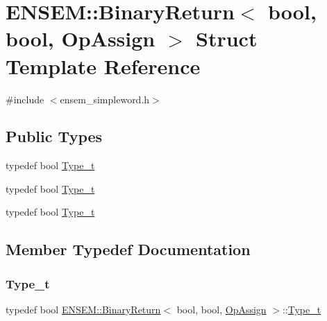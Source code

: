 \hypertarget{structENSEM_1_1BinaryReturn_3_01bool_00_01bool_00_01OpAssign_01_4}{}\section{E\+N\+S\+EM\+:\+:Binary\+Return$<$ bool, bool, Op\+Assign $>$ Struct Template Reference}
\label{structENSEM_1_1BinaryReturn_3_01bool_00_01bool_00_01OpAssign_01_4}


{\ttfamily \#include $<$ensem\+\_\+simpleword.\+h$>$}

\subsection*{Public Types}
\begin{DoxyCompactItemize}
\item 
typedef bool \mbox{\hyperlink{structENSEM_1_1BinaryReturn_3_01bool_00_01bool_00_01OpAssign_01_4_a5520ece3a7087e94fe3d252e1d2ab29f}{Type\+\_\+t}}
\item 
typedef bool \mbox{\hyperlink{structENSEM_1_1BinaryReturn_3_01bool_00_01bool_00_01OpAssign_01_4_a5520ece3a7087e94fe3d252e1d2ab29f}{Type\+\_\+t}}
\item 
typedef bool \mbox{\hyperlink{structENSEM_1_1BinaryReturn_3_01bool_00_01bool_00_01OpAssign_01_4_a5520ece3a7087e94fe3d252e1d2ab29f}{Type\+\_\+t}}
\end{DoxyCompactItemize}


\subsection{Member Typedef Documentation}
\mbox{\label{structENSEM_1_1BinaryReturn_3_01bool_00_01bool_00_01OpAssign_01_4_a5520ece3a7087e94fe3d252e1d2ab29f}} 
\subsubsection{\texorpdfstring{Type\_t}{Type\_t}\hspace{0.1cm}{\footnotesize\ttfamily [1/3]}}
{\footnotesize\ttfamily typedef bool \mbox{\hyperlink{structENSEM_1_1BinaryReturn}{E\+N\+S\+E\+M\+::\+Binary\+Return}}$<$ bool, bool, \mbox{\hyperlink{structENSEM_1_1OpAssign}{Op\+Assign}} $>$\+::\mbox{\hyperlink{structENSEM_1_1BinaryReturn_3_01bool_00_01bool_00_01OpAssign_01_4_a5520ece3a7087e94fe3d252e1d2ab29f}{Type\+\_\+t}}}

